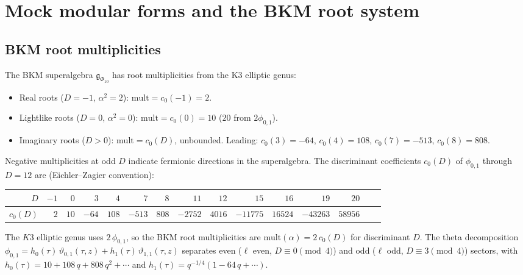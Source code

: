 
\section{Mock modular forms and the BKM root system}
\label{sec:mock-modular-bkm}

\subsection{BKM root multiplicities}
\label{subsec:bkm-roots}

\begin{proposition}
\label{prop:bkm-roots}
The BKM superalgebra $\mathfrak{g}_{\Phi_{10}}$ has root
multiplicities from the K3 elliptic genus:
\begin{itemize}
\item Real roots ($D = -1$, $\alpha^2 = 2$):
 $\mathrm{mult} = c_0(-1) = 2$.
\item Lightlike roots ($D = 0$, $\alpha^2 = 0$):
 $\mathrm{mult} = c_0(0) = 10$
 \textup{(}$20$ from $2\phi_{0,1}$\textup{)}.
\item Imaginary roots ($D > 0$):
 $\mathrm{mult} = c_0(D)$, unbounded.
 Leading: $c_0(3) = -64$, $c_0(4) = 108$,
 $c_0(7) = -513$, $c_0(8) = 808$.
\end{itemize}
Negative multiplicities at odd $D$ indicate fermionic
directions in the superalgebra. The discriminant coefficients
$c_0(D)$ of $\phi_{0,1}$ through $D = 12$ are
\textup{(}Eichler--Zagier convention\textup{)}:
\begin{center}
\small
\renewcommand{\arraystretch}{1.2}
\begin{tabular}{r|rrrrrrrrrrrrrr}
$D$ & $-1$ & $0$ & $3$ & $4$ & $7$ & $8$
 & $11$ & $12$ & $15$ & $16$ & $19$ & $20$ \\
\hline
$c_0(D)$ & $2$ & $10$ & $-64$ & $108$ & $-513$ & $808$
 & $-2752$ & $4016$ & $-11775$ & $16524$ & $-43263$ & $58956$
\end{tabular}
\end{center}
The $K3$ elliptic genus uses $2\,\phi_{0,1}$, so the BKM root
multiplicities are $\mathrm{mult}(\alpha) = 2\,c_0(D)$ for
discriminant $D$. The theta decomposition
$\phi_{0,1} = h_0(\tau)\,\vartheta_{0,1}(\tau,z)
+ h_1(\tau)\,\vartheta_{1,1}(\tau,z)$ separates even
($\ell$ even, $D \equiv 0 \pmod{4}$) and odd
($\ell$ odd, $D \equiv 3 \pmod{4}$) sectors, with
$h_0(\tau) = 10 + 108\,q + 808\,q^2 + \cdots$ and
$h_1(\tau) = q^{-1/4}(1 - 64\,q + \cdots)$.
\end{proposition}


